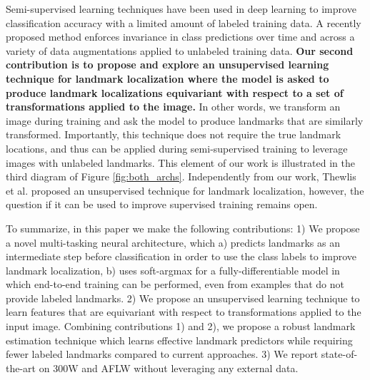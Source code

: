 \documentclass[10pt,twocolumn,letterpaper]{article}
\begin{document}
Semi-supervised learning techniques \cite{salimans2016improved, rasmus2015semi, weston2012deep, wan2017crossing} have been used in deep learning to improve classification accuracy with a limited amount of labeled training data. A recently proposed method \cite{laine2016temporal} 
enforces invariance in class predictions over time and across a variety of data augmentations applied to unlabeled training data. \textbf{Our second contribution is to propose and explore an unsupervised learning technique for landmark localization where the model is asked to produce landmark localizations equivariant with respect to a set of transformations applied to the image.} In other words, we transform an image during training and ask the model to produce landmarks that are similarly transformed. Importantly, this technique does not require the true landmark locations, and thus can be applied during semi-supervised training to leverage images with unlabeled landmarks. This element of our work is illustrated in the third diagram of Figure \ref{fig:both_archs}. Independently from our work, Thewlis et al. \cite{Thewlis_2017_ICCV} 
proposed an unsupervised technique for landmark localization, however, the question if it can be used to improve supervised training remains open. 

To summarize, in this paper we make the following contributions:
1) We propose a novel multi-tasking neural architecture, which a) predicts landmarks as an intermediate step before classification in order to use the class labels to improve landmark localization, b) uses soft-argmax for a fully-differentiable model in which end-to-end training can be performed, even from examples that do not provide labeled landmarks.
2) We propose an unsupervised learning technique to learn features that are equivariant with respect to transformations applied to the input image. 
Combining contributions 1) and 2), we propose a robust landmark estimation technique which learns effective landmark predictors while requiring fewer labeled landmarks compared to current approaches.
3) We report state-of-the-art on 300W \cite{sagonas2013300} and AFLW \cite{AFLW_2011} without leveraging any external data.
 
\end{document}
